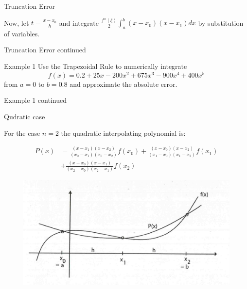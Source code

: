 \documentclass[12pt]{beamer}
\begin{document}
\begin{frame}{Truncation Error} 

Now, let $t = \frac{x-x_0}{h}$ and integrate $\frac{f''(\xi)}{2} \int_{a}^{b} (x-x_0)(x-x_1)dx$ by substitution of variables.
\vspace{3 in}

\end{frame} 

\begin{frame}{Truncation Error continued} 


\end{frame} 

\begin{frame}{Example 1}
Use the Trapezoidal Rule to numerically integrate \[f(x)=0.2+25x-200x^2+675x^3-900x^4+400x^5\] from $a=0$ to $b=0.8$ and approximate the absolute error.
\vspace{3 in}
\end{frame}

\begin{frame}{Example 1 continued}

\end{frame}

\begin{frame}{Qudratic case}

For the case $n=2$ the quadratic interpolating polynomial is: 

\begin{align*} 
P(x) &= \frac{(x-x_1)(x-x_2)}{(x_0-x_1)(x_0-x_2)}f(x_0)
+ \frac{(x-x_0)(x-x_2)}{(x_1-x_0)(x_1-x_2)}f(x_1) \\ 
& + \frac{(x-x_0)(x-x_1)}{(x_2-x_0)(x_2-x_1)}f(x_2)
\end{align*}
\begin{figure} 
  \centering
  \includegraphics[scale=0.35]{quadratic_interpolating}
  \label{fig:linear}
\end{figure}
\end{frame}
\end{document}
